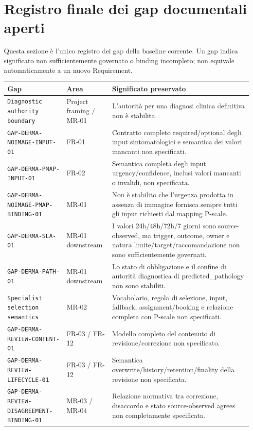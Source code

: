 \documentclass[11pt,a4paper]{article}
\begin{document}
\clearpage
\section{Registro finale dei gap documentali aperti}

Questa sezione è l'unico registro dei gap della baseline corrente. Un gap indica significato non sufficientemente governato o binding incompleto; non equivale automaticamente a un nuovo Requirement.

\small
\begin{longtable}{L{50mm}L{29mm}L{64mm}}
\toprule
\textbf{Gap} & \textbf{Area} & \textbf{Significato preservato} \\
\midrule
\endhead
\texttt{Diagnostic authority boundary} & Project framing / MR-01 & L'autorità per una diagnosi clinica definitiva non è stabilita. \\
\nolinkurl{GAP-DERMA-NOIMAGE-INPUT-01} & FR-01 & Contratto completo required/optional degli input sintomatologici e semantica dei valori mancanti non specificati. \\
\nolinkurl{GAP-DERMA-PMAP-INPUT-01} & FR-02 & Semantica completa degli input urgency/confidence, inclusi valori mancanti o invalidi, non specificata. \\
\nolinkurl{GAP-DERMA-NOIMAGE-PMAP-BINDING-01} & MR-01 & Non è stabilito che l'urgenza prodotta in assenza di immagine fornisca sempre tutti gli input richiesti dal mapping P-scale. \\
\nolinkurl{GAP-DERMA-SLA-01} & MR-01 downstream & I valori 24h/48h/72h/7 giorni sono source-observed, ma trigger, outcome, owner e natura limite/target/raccomandazione non sono sufficientemente governati. \\
\nolinkurl{GAP-DERMA-PATH-01} & MR-01 downstream & Lo stato di obbligazione e il confine di autorità diagnostica di predicted\_pathology non sono stabiliti. \\
\texttt{Specialist selection semantics} & MR-02 & Vocabolario, regola di selezione, input, fallback, assignment/booking e relazione completa con P-scale non specificati. \\
\nolinkurl{GAP-DERMA-REVIEW-CONTENT-01} & FR-03 / FR-12 & Modello completo del contenuto di revisione/correzione non specificato. \\
\nolinkurl{GAP-DERMA-REVIEW-LIFECYCLE-01} & FR-03 / FR-12 & Semantica overwrite/history/retention/finality della revisione non specificata. \\
\nolinkurl{GAP-DERMA-REVIEW-DISAGREEMENT-BINDING-01} & MR-03 / MR-04 & Relazione normativa tra correzione, disaccordo e stato source-observed agrees non completamente specificata. \\

\end{longtable}
\end{document}
